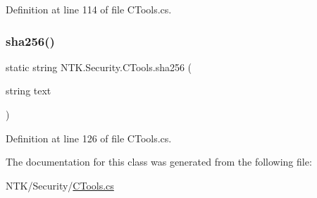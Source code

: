Definition at line 114 of file C\+Tools.\+cs.

\mbox{\label{class_n_t_k_1_1_security_1_1_c_tools_ae2da5a3353e281bb618133d2344f1e91}} 
\subsubsection{\texorpdfstring{sha256()}{sha256()}}
{\footnotesize\ttfamily static string N\+T\+K.\+Security.\+C\+Tools.\+sha256 (\begin{DoxyParamCaption}\item[{string}]{text }\end{DoxyParamCaption})\hspace{0.3cm}{\ttfamily [static]}}



Definition at line 126 of file C\+Tools.\+cs.



The documentation for this class was generated from the following file\+:\begin{DoxyCompactItemize}
\item 
N\+T\+K/\+Security/\mbox{\hyperlink{_c_tools_8cs}{C\+Tools.\+cs}}\end{DoxyCompactItemize}
